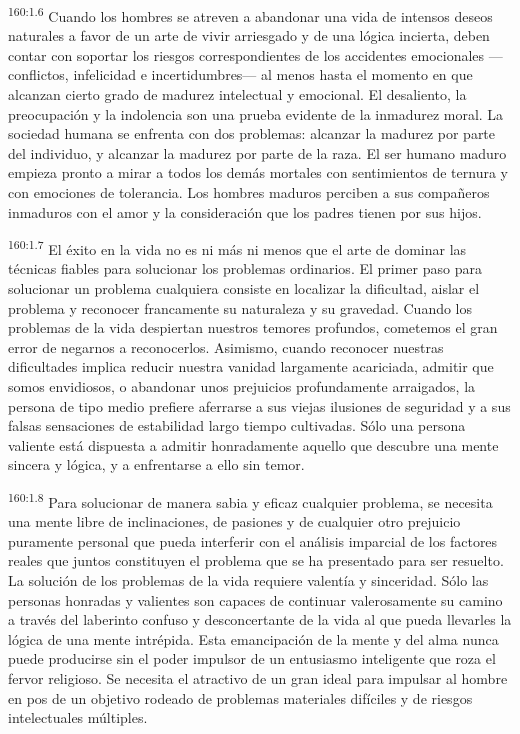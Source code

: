 \par 
\textsuperscript{160:1.6} Cuando los hombres se atreven a abandonar una vida de intensos deseos naturales a favor de un arte de vivir arriesgado y de una lógica incierta, deben contar con soportar los riesgos correspondientes de los accidentes emocionales ---conflictos, infelicidad e incertidumbres--- al menos hasta el momento en que alcanzan cierto grado de madurez intelectual y emocional. El desaliento, la preocupación y la indolencia son una prueba evidente de la inmadurez moral. La sociedad humana se enfrenta con dos problemas: alcanzar la madurez por parte del individuo, y alcanzar la madurez por parte de la raza. El ser humano maduro empieza pronto a mirar a todos los demás mortales con sentimientos de ternura y con emociones de tolerancia. Los hombres maduros perciben a sus compañeros inmaduros con el amor y la consideración que los padres tienen por sus hijos.

\par 
\textsuperscript{160:1.7} El éxito en la vida no es ni más ni menos que el arte de dominar las técnicas fiables para solucionar los problemas ordinarios. El primer paso para solucionar un problema cualquiera consiste en localizar la dificultad, aislar el problema y reconocer francamente su naturaleza y su gravedad. Cuando los problemas de la vida despiertan nuestros temores profundos, cometemos el gran error de negarnos a reconocerlos. Asimismo, cuando reconocer nuestras dificultades implica reducir nuestra vanidad largamente acariciada, admitir que somos envidiosos, o abandonar unos prejuicios profundamente arraigados, la persona de tipo medio prefiere aferrarse a sus viejas ilusiones de seguridad y a sus falsas sensaciones de estabilidad largo tiempo cultivadas. Sólo una persona valiente está dispuesta a admitir honradamente aquello que descubre una mente sincera y lógica, y a enfrentarse a ello sin temor.

\par 
\textsuperscript{160:1.8} Para solucionar de manera sabia y eficaz cualquier problema, se necesita una mente libre de inclinaciones, de pasiones y de cualquier otro prejuicio puramente personal que pueda interferir con el análisis imparcial de los factores reales que juntos constituyen el problema que se ha presentado para ser resuelto. La solución de los problemas de la vida requiere valentía y sinceridad. Sólo las personas honradas y valientes son capaces de continuar valerosamente su camino a través del laberinto confuso y desconcertante de la vida al que pueda llevarles la lógica de una mente intrépida. Esta emancipación de la mente y del alma nunca puede producirse sin el poder impulsor de un entusiasmo inteligente que roza el fervor religioso. Se necesita el atractivo de un gran ideal para impulsar al hombre en pos de un objetivo rodeado de problemas materiales difíciles y de riesgos intelectuales múltiples.

